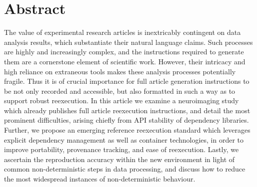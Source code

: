 \section{Abstract}

The value of experimental research articles is inextricably contingent on data analysis results, which substantiate their natural language claims.
Such processes are highly and increasingly complex, and the instructions required to generate them are a cornerstone element of scientific work.
However, their intricacy and high reliance on extraneous tools makes these analysis processes potentially fragile.
Thus it is of crucial importance for full article generation instructions to be not only recorded and accessible, but also formatted in such a way as to support robust reexecution.
In this article we examine a neuroimaging study which already publishes full article reexecution instructions, and detail the most prominent difficulties, arising chiefly from API stability of dependency libraries.
Further, we propose an emerging reference reexecution standard which leverages explicit dependency management as well as container technologies, in order to improve portability, provenance tracking, and ease of reexecution.
Lastly, we ascertain the reproduction accuracy within the new environment in light of common non-deterministic steps in data processing, and discuss how to reduce the most widespread instances of non-deterministic behaviour.

